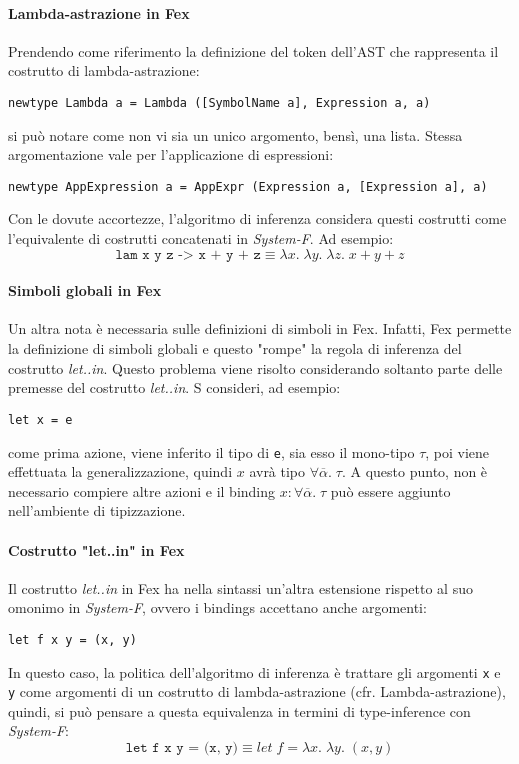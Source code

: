\documentclass[10pt,a4paper]{article}
\begin{document}
\paragraph{Lambda-astrazione in Fex}
Prendendo come riferimento la definizione del token
dell'AST che rappresenta il costrutto di lambda-astrazione:
\begin{lstlisting}
newtype Lambda a = Lambda ([SymbolName a], Expression a, a)
\end{lstlisting}
si può notare come non vi sia un unico argomento, bensì, una lista. Stessa argomentazione vale per l'applicazione
di espressioni:
\begin{lstlisting}
newtype AppExpression a = AppExpr (Expression a, [Expression a], a)
\end{lstlisting}
Con le dovute accortezze, l'algoritmo di inferenza considera questi costrutti come l'equivalente di costrutti
concatenati in \textit{System-F}. Ad esempio:
\[ \texttt{lam x y z -> x + y + z} \equiv \lambda x. \; \lambda y. \; \lambda z. \; x + y + z \]

\paragraph{Simboli globali in Fex}
Un altra nota è necessaria sulle definizioni di simboli in Fex. Infatti, Fex permette la definizione di simboli
globali e questo "rompe" la regola di inferenza del costrutto \textit{let..in}. Questo problema viene risolto
considerando soltanto parte delle premesse del costrutto \textit{let..in}. S consideri, ad esempio:
\begin{lstlisting}
let x = e
\end{lstlisting}
come prima azione, viene inferito il tipo di \texttt{e}, sia esso il mono-tipo $ \tau $, poi viene effettuata la
generalizzazione, quindi $ x $ avrà tipo $ \forall \overline{\alpha}. \; \tau $. A questo punto, non è necessario
compiere altre azioni e il binding $ x : \forall \overline{\alpha}. \; \tau $ può essere aggiunto nell'ambiente di
tipizzazione.

\paragraph{Costrutto "let..in" in Fex}
Il costrutto \textit{let..in} in Fex ha nella sintassi un'altra estensione rispetto al suo omonimo in \textit{System-F},
ovvero i bindings accettano anche argomenti:
\begin{lstlisting}
let f x y = (x, y)
\end{lstlisting}
In questo caso, la politica dell'algoritmo di inferenza è trattare gli argomenti \texttt{x} e \texttt{y} come argomenti
di un costrutto di lambda-astrazione (cfr. Lambda-astrazione), quindi, si può pensare a questa equivalenza in termini
di type-inference con \textit{System-F}:
\[ \texttt{let f x y = (x, y)} \equiv let \; f = \lambda x. \; \lambda y. \; (x, y) \]
\end{document}
